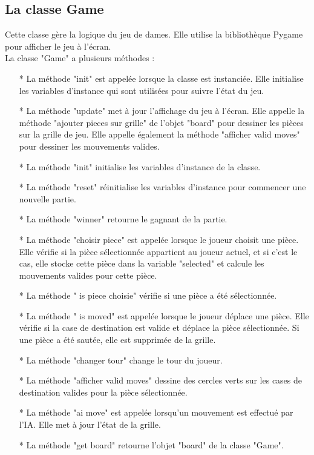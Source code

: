 \documentclass[12pt]{article}
\begin{document}
	 \subsection{La classe Game}
	 Cette classe gère la logique du jeu de dames. Elle utilise la bibliothèque Pygame pour afficher le jeu à l'écran.\\
	 La classe "Game" a plusieurs méthodes :\\
	 \begin{itemize}
	 	\item[* ]  La méthode "init" est appelée lorsque la classe est instanciée. Elle initialise les variables d'instance qui sont utilisées pour suivre l'état du jeu.
	 	\item[* ] La méthode "update" met à jour l'affichage du jeu à l'écran. Elle appelle la méthode "ajouter pieces sur grille" de l'objet "board" pour dessiner les pièces sur la grille de jeu. Elle appelle également la méthode "afficher valid moves" pour dessiner les mouvements valides.
	 	\item[* ] La méthode "init" initialise les variables d'instance de la classe.
	 	\item[* ] La méthode "reset" réinitialise les variables d'instance pour commencer une nouvelle partie.
	 	\item[* ]  La méthode "winner" retourne le gagnant de la partie.
	 	\item[* ]  La méthode "choisir piece" est appelée lorsque le joueur choisit une pièce. Elle vérifie si la pièce sélectionnée appartient au joueur actuel, et si c'est le cas, elle stocke cette pièce dans la variable "selected" et calcule les mouvements valides pour cette pièce.
	 	\item[* ] La méthode " is piece choisie" vérifie si une pièce a été sélectionnée.
	 	\item[* ] La méthode " is moved" est appelée lorsque le joueur déplace une pièce. Elle vérifie si la case de destination est valide et déplace la pièce sélectionnée. Si une pièce a été sautée, elle est supprimée de la grille.
	 	\item[* ]  La méthode "changer tour" change le tour du joueur.
	 	\item[* ] La méthode "afficher valid moves" dessine des cercles verts sur les cases de destination valides pour la pièce sélectionnée.
	 	\item[* ] La méthode "ai move" est appelée lorsqu'un mouvement est effectué par l'IA. Elle met à jour l'état de la grille.
	 	\item[* ]  La méthode "get board" retourne l'objet "board" de la classe "Game".
	 	
	 \end{itemize}
\end{document}
